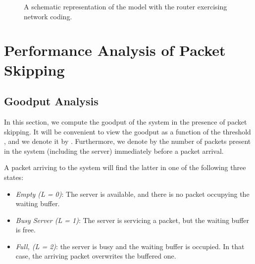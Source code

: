 \documentclass[preprint,12pt]{elsarticle}
\theoremstyle{definition}
\theoremstyle{plain}
\theoremstyle{remark}
\begin{document}
\begin{figure}[t]
\centering
{}
\caption{A schematic representation of the model with the router exercising network coding.}
\label{fig: model_nc}
\end{figure}



\section{Performance Analysis of Packet Skipping} \label{section:analysis-thresholding}

\subsection{Goodput Analysis}\label{section:renegingGoodputAnalysis}

In this section, we compute the goodput of the system in the presence of packet skipping. It will be convenient to view the goodput as a function of the threshold , and we denote it by . Furthermore, we denote by  the number of packets present in the system (including the server) immediately before a packet arrival.

A packet arriving to the system will find the latter in one of the following three states:
\begin{itemize}
	\item \textit{Empty (L = 0)}: The server is available, and there is no packet occupying the waiting buffer.
	\item \textit{Busy Server (L = 1)}: The server is servicing a packet, but the waiting buffer is free.
	\item \textit{Full, (L = 2)}: the server is busy and the waiting buffer is occupied. In that case, the arriving packet overwrites the buffered one.
\end{itemize}
\end{document}
